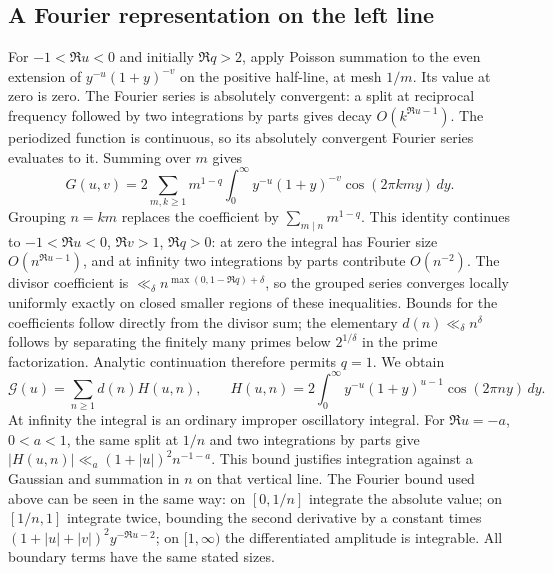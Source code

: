 \subsection{A Fourier representation on the left line}
For $-1<\Re u<0$ and initially $\Re q>2$, apply Poisson summation
to the even extension of $y^{-u}(1+y)^{-v}$ on the positive half-line,
at mesh $1/m$. Its value at zero is zero. The Fourier series is
absolutely convergent: a split at reciprocal frequency followed by
two integrations by parts gives decay $O(k^{\Re u-1})$.
The periodized function is continuous, so its absolutely convergent
Fourier series evaluates to it. Summing over $m$ gives
\[
 G(u,v)=2\sum_{m,k\ge1}m^{1-q}
       \int_0^\infty y^{-u}(1+y)^{-v}\cos(2\pi kmy)\,dy.
\]
Grouping $n=km$ replaces the coefficient by
$\sum_{m\mid n}m^{1-q}$. This identity continues to
$-1<\Re u<0$, $\Re v>1$, $\Re q>0$: at zero the integral has
Fourier size $O(n^{\Re u-1})$, and at infinity two integrations by
parts contribute $O(n^{-2})$. The divisor coefficient is
$\ll_\delta n^{\max(0,1-\Re q)+\delta}$, so the grouped series
converges locally uniformly exactly on closed smaller regions of
these inequalities. Bounds for the coefficients follow directly from
the divisor sum; the elementary $d(n)\ll_\delta n^\delta$ follows
by separating the finitely many primes below $2^{1/\delta}$ in the
prime factorization. Analytic continuation therefore permits $q=1$.
We obtain
\begin{equation}\label{eq:leftG}
 \mathcal G(u)=\sum_{n\ge1}d(n)H(u,n),\qquad
 H(u,n)=2\int_0^\infty y^{-u}(1+y)^{u-1}\cos(2\pi ny)\,dy.
\end{equation}
At infinity the integral is an ordinary improper oscillatory integral.
For $\Re u=-a$, $0<a<1$, the same split at $1/n$ and two integrations
by parts give
$|H(u,n)|\ll_a(1+|u|)^2 n^{-1-a}$.
This bound justifies integration against a Gaussian and summation
in $n$ on that vertical line. The Fourier bound used
above can be seen in the same way: on $[0,1/n]$ integrate the
absolute value; on $[1/n,1]$ integrate twice, bounding the second
derivative by a constant times $(1+|u|+|v|)^2y^{-\Re u-2}$;
on $[1,\infty)$ the differentiated amplitude is integrable.
All boundary terms have the same stated sizes.


